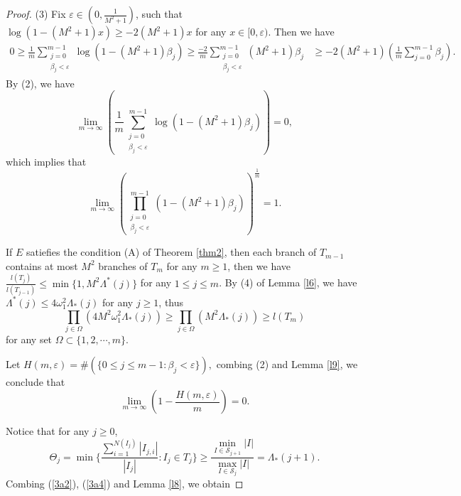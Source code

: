 \documentclass[reqno]{amsart}
\theoremstyle{plain}
\theoremstyle{definition}
\theoremstyle{remark}
\numberwithin{equation}{section} \DeclareMathOperator\intr{int}
\begin{document}
\begin{proof}
(3) Fix $\varepsilon \in(0,\frac{1}{M^2+1} )$, such that $\log(1-(M^2+1)x)\ge -2(M^2+1)x$
for any $x\in[0,\varepsilon)$.
Then we have
\begin{equation*}
\begin{aligned}
0\ge \frac{1}{m} \sum_{\substack{j = 0\\\beta_j<\varepsilon }}^{m-1}\log(1-(M^2+1)\beta_j)\ge\frac{-2}{m} \sum_{\substack{j = 0\\\beta_j<\varepsilon }}^{m-1}(M^2+1)\beta_j&\ge
 -2(M^2+1)(\frac{1}{m}\sum_{j=0}^{m-1}\beta_j ).
\end{aligned}
\end{equation*}
By (2),
we have
\begin{equation*}
\lim_{m \to \infty} (\frac{1}{m} \sum_{\substack{j = 0\\\beta_j<\varepsilon }}^{m-1}\log(1-(M^2+1)\beta_j))=0,
\end{equation*}
which implies that
\begin{equation}\label{3a1}
\lim_{m \to \infty} ( \prod_{\substack{j = 0\\\beta_j<\varepsilon }}^{m-1}(1-(M^2+1)\beta_j))^{\frac{1}{m} }=1.
\end{equation}


If $E$ satiefies the condition {\rm(A)} of Theorem {\rm\ref{thm2}}, then each branch of $T_{m-1}$ contains at most $M^{2}$ branches of $T_{m}$ for any $m\ge1$, then we have $\frac{l(T_j) }{l(T_{j-1})}\le \min\{1,M^2\Lambda ^*(j)\}$ for any $1\le j \le m$. By (4) of Lemma \ref{l6}, we have $\Lambda^*(j)\le4\omega_1^2\Lambda_*(j)$ for any $j\ge 1$,
thus
\begin{equation}\label{3a2}
\prod_{j\in\Omega } (4M^2\omega_1^2\Lambda_*(j))\ge \prod_{j\in\Omega } (M^2\Lambda_*(j))\ge l(T_m)
\end{equation}
for any set $\Omega \subset \{1,2,\cdots,m\}$.


Let $H(m,\varepsilon)=\# (\{0\le j \le m-1:\beta_j<\varepsilon\}),$ combing (2) and Lemma \ref{l9}, we conclude that
\begin{equation}\label{3a3}
\lim_{m \to \infty} (1-\frac{H(m,\varepsilon )}{m}) =0.
\end{equation}

Notice that  for any $j\ge 0$, \begin{equation}\label{3a4}
\Theta_j=\min\{\frac{\sum_{i=1}^{N(I_j) }\left | I_{j,i} \right | }{\left | I_j \right | }: I_j\in T_j \}\ge \frac{\min_{I\in \mathcal{S}_{j+1} }\left | I \right | }{\max_{I\in \mathcal{S}_{j} }\left | I \right |}=\Lambda_*(j+1).
\end{equation}
Combing (\ref{3a2}), (\ref{3a4}) and Lemma \ref{l8}, we obtain



\end{proof}
\end{document}

